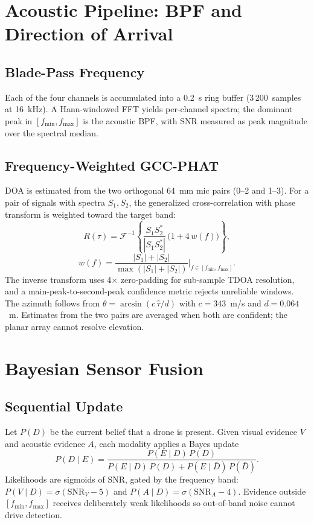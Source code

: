 \documentclass[conference]{IEEEtran}
\begin{document}
\section{Acoustic Pipeline: BPF and Direction of Arrival}
\label{sec:acoustic}

\subsection{Blade-Pass Frequency}
Each of the four channels is accumulated into a 0.2~s ring buffer
(3\,200~samples at 16~kHz). A Hann-windowed FFT yields per-channel spectra;
the dominant peak in $[f_{\min}, f_{\max}]$ is the acoustic BPF, with SNR
measured as peak magnitude over the spectral median.

\subsection{Frequency-Weighted GCC-PHAT}
DOA is estimated from the two orthogonal 64~mm mic pairs (0--2 and 1--3). For
a pair of signals with spectra $S_1, S_2$, the generalized cross-correlation
with phase transform is weighted toward the target band:
\begin{equation}
R(\tau) = \mathcal{F}^{-1}\!\left\{
\frac{S_1 S_2^{*}}{|S_1 S_2^{*}|}\,\bigl(1 + 4\,w(f)\bigr) \right\},
\end{equation}
\begin{equation}
w(f)=\frac{|S_1|+|S_2|}{\max(|S_1|+|S_2|)}\Big|_{f\in[f_{\min},f_{\max}]}.
\end{equation}
The inverse transform uses 4$\times$ zero-padding for sub-sample TDOA
resolution, and a main-peak-to-second-peak confidence metric rejects
unreliable windows. The azimuth follows from
$\theta = \arcsin(c\,\hat\tau / d)$ with $c=343$~m/s and $d=0.064$~m.
Estimates from the two pairs are averaged when both are confident; the planar
array cannot resolve elevation.

\section{Bayesian Sensor Fusion}
\label{sec:fusion}

\subsection{Sequential Update}
Let $P(D)$ be the current belief that a drone is present. Given visual
evidence $V$ and acoustic evidence $A$, each modality applies a Bayes update
\begin{equation}
P(D\mid E) = \frac{P(E\mid D)\,P(D)}
{P(E\mid D)\,P(D) + P(E\mid \bar D)\,P(\bar D)} .
\end{equation}
Likelihoods are sigmoids of SNR, gated by the frequency band:
$P(V\mid D) = \sigma(\mathrm{SNR}_V - 5)$ and
$P(A\mid D) = \sigma(\mathrm{SNR}_A - 4)$. Evidence outside
$[f_{\min}, f_{\max}]$ receives deliberately weak likelihoods so out-of-band
noise cannot drive detection.
\end{document}
